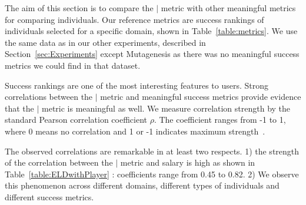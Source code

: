 {The aim of this section is to compare the $\mid$ metric with other meaningful metrics for comparing individuals. Our reference metrics are success rankings of individuals selected for a specific domain, shown in Table~\ref{table:metrics}. We use the same data as in our other experiments, described in Section~\ref{sec:Experiments} except Mutagenesis as there was no meaningful success metrics we could find in that dataset. 

Success rankings are one of the most interesting features to users. Strong correlations between the $\mid$ metric and meaningful success metrics provide evidence that the $\mid$ metric is meaningful as well. We measure correlation strength by the standard Pearson correlation coefficient $\rho$. The coefficient ranges from -1 to 1, where 0 means no correlation and 1 or -1 indicates maximum strength~\cite{Fisher1921}.

The observed correlations are remarkable in at least two respects. 1) the strength of the correlation between the $\mid$ metric and salary is high as shown in Table~\ref{table:ELDwithPlayer} : coefficients range from 0.45 to 0.82. 2) We observe this phenomenon across different domains, different types of individuals and different success metrics.


\begin{table}[htbp]
	
	\centering
		\caption{Success metrics and their distributions.\label{table:metrics}}	
	\end{table}



}
